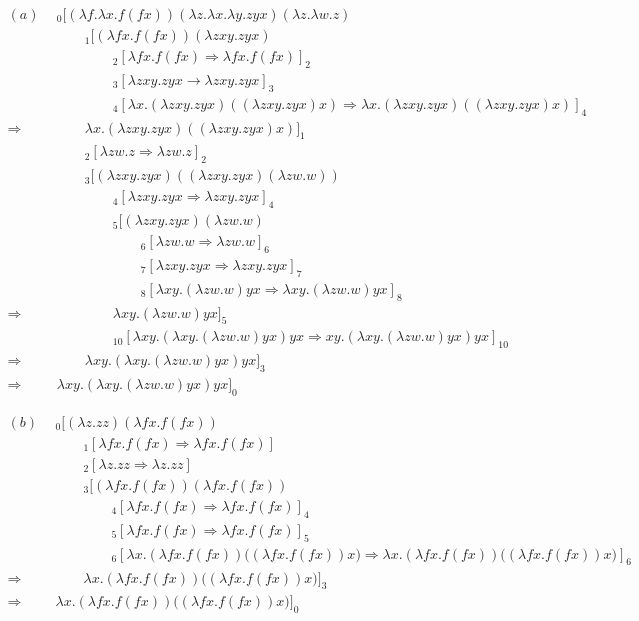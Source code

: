 \documentclass[article, 12pt]{article}
\begin{document}
\begin{align*}
  (a) ~ ~ 
  &_0[\left( \lambda f. \lambda x. f ( fx ) \right)\left( \lambda z. \lambda x.
  \lambda y. zyx \right) \left( \lambda z. \lambda w. z \right)  \\ 
  &\qquad _1[ ( \lambda fx. f(fx) ) (\lambda zxy. zyx)  \\ 
  &\qquad\qquad_2[ \lambda fx. f(fx) \Rightarrow \lambda fx.f(fx)]_2 \\ 
  &\qquad\qquad_3[\lambda zxy. zyx \to \lambda zxy.zyx]_3 \\ 
  &\qquad \qquad _4[\lambda x.(\lambda zxy.zyx)((\lambda zxy.zyx) x) \Rightarrow
  \lambda x.(\lambda zxy.zyx)((\lambda zxy.zyx) x)]_4 \\ 
  \Rightarrow & \qquad\lambda x.(\lambda zxy.zyx)(( \lambda zxy.zyx ) x)]_1\\
  &\qquad_2[\lambda zw. z \Rightarrow \lambda zw. z]_2 \\ 
  &\qquad_3[(\lambda zxy. zyx)(( \lambda zxy.zyx )(\lambda zw.w)) \\ 
  &\qquad \qquad  _4[\lambda zxy.zyx \Rightarrow \lambda zxy. zyx ]_4 \\ 
  & \qquad \qquad _5[( \lambda zxy.zyx )(\lambda zw. w)\\
  &\qquad \qquad \qquad _6[\lambda zw.  w \Rightarrow \lambda zw. w]_6 \\ 
  &\qquad\qquad\qquad _7[\lambda zxy. zyx \Rightarrow \lambda zxy. zyx]_7 \\ 
  &\qquad \qquad \qquad _8[\lambda xy.(\lambda zw. w)yx \Rightarrow\lambda
  xy.(\lambda zw. w)yx ]_8 \\ 
  \Rightarrow & \qquad \qquad \lambda xy.(\lambda zw. w)yx ]_5 \\ 
  &\qquad \qquad _{10}[\lambda xy.(\lambda xy.(\lambda zw.w)yx)yx \Rightarrow
  xy.(\lambda xy.(\lambda zw.w)yx)yx]_{10} \\ 
  \Rightarrow &\qquad \lambda xy.(\lambda xy.(\lambda zw.w)yx)yx ]_{3} \\ 
  \Rightarrow& \lambda xy. (\lambda xy.(\lambda zw.w)yx)yx]_0
\end{align*}
\pagebreak 

\begin{align*}
(b) ~ ~ 
& _0[(\lambda z. zz)(\lambda fx. f(fx)) \\ 
&\qquad _1[\lambda fx. f(fx) \Rightarrow \lambda fx. f(fx)] \\ 
&\qquad _2[\lambda z. zz \Rightarrow \lambda z. zz] \\ 
&\qquad _3[(\lambda fx. f(fx))(\lambda fx. f(fx)) \\ 
&\qquad \qquad _4[ \lambda fx. f(fx) \Rightarrow \lambda fx.f(fx)]_4 \\ 
&\qquad\qquad _5[\lambda fx. f(fx) \Rightarrow \lambda fx.f(fx)]_5 \\ 
&\qquad\qquad _6[\lambda x.(\lambda fx. f(fx))\big((\lambda fx. f(fx)) x\big)\Rightarrow
\lambda x.(\lambda fx. f(fx))\big((\lambda fx. f(fx)) x\big) ]_6 \\ 
  \Rightarrow&\qquad  \lambda x.(\lambda fx. f(fx))\big((\lambda fx. f(fx))
  x\big)]_3\\
\Rightarrow& \lambda x.(\lambda fx. f(fx))\big((\lambda fx. f(fx))
  x\big)]_0
\end{align*}
\end{document}
